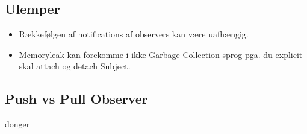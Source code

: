 \documentclass[../SWD_disp.tex]{subfiles}
\begin{document}
\subsection*{Ulemper}
\begin{itemize}
    \item Rækkefølgen af notifications af observers kan være uafhængig.
    \item Memoryleak kan forekomme i ikke Garbage-Collection sprog pga. du explicit skal attach og detach Subject.
\end{itemize}
\subsection{Push vs Pull Observer}
donger





\end{document}
